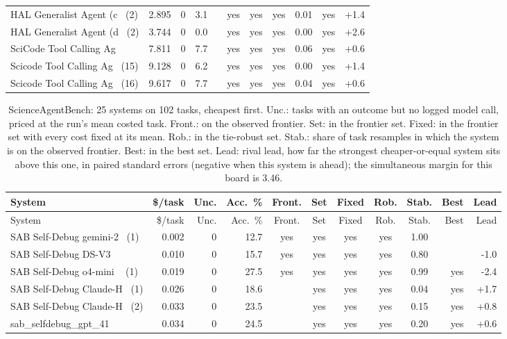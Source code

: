 {\begin{longtable}{lrrrcccccrr}
HAL Generalist Agent (c~ (2) & 2.895 & 0 & 3.1 &  & yes & yes & yes & 0.01 & yes & +1.4 \\
HAL Generalist Agent (d~ (2) & 3.744 & 0 & 0.0 &  & yes & yes & yes & 0.00 & yes & +2.6 \\
SciCode Tool Calling Ag~ & 7.811 & 0 & 7.7 &  & yes & yes & yes & 0.06 & yes & +0.6 \\
Scicode Tool Calling Ag~ (15) & 9.128 & 0 & 6.2 &  & yes & yes & yes & 0.00 & yes & +1.4 \\
Scicode Tool Calling Ag~ (16) & 9.617 & 0 & 7.7 &  & yes & yes & yes & 0.04 & yes & +0.6 \\
\end{longtable}

\begin{longtable}{lrrrcccccrr}
\caption{ScienceAgentBench: 25 systems on 102 tasks, cheapest first. Unc.: tasks with an outcome but no logged model call, priced at the run's mean costed task. Front.: on the observed frontier. Set: in the frontier set. Fixed: in the frontier set with every cost fixed at its mean. Rob.: in the tie-robust set. Stab.: share of task resamples in which the system is on the observed frontier. Best: in the best set. Lead: rival lead, how far the strongest cheaper-or-equal system sits above this one, in paired standard errors (negative when this system is ahead); the simultaneous margin for this board is 3.46.}\label{tab:supp-hal_scienceagentbench}\\
\toprule
System & \$/task & Unc. & Acc.\ \% & Front. & Set & Fixed & Rob. & Stab. & Best & Lead \\
\midrule
\endfirsthead
\toprule
System & \$/task & Unc. & Acc.\ \% & Front. & Set & Fixed & Rob. & Stab. & Best & Lead \\
\midrule
\endhead
\bottomrule
\endfoot
SAB Self-Debug gemini-2~ (1) & 0.002 & 0 & 12.7 & yes & yes & yes & yes & 1.00 &  &  \\
SAB Self-Debug DS-V3 & 0.010 & 0 & 15.7 & yes & yes & yes & yes & 0.80 &  & -1.0 \\
SAB Self-Debug o4-mini ~ (1) & 0.019 & 0 & 27.5 & yes & yes & yes & yes & 0.99 & yes & -2.4 \\
SAB Self-Debug Claude-H~ (1) & 0.026 & 0 & 18.6 &  & yes & yes & yes & 0.04 & yes & +1.7 \\
SAB Self-Debug Claude-H~ (2) & 0.033 & 0 & 23.5 &  & yes & yes & yes & 0.15 & yes & +0.8 \\
sab\_selfdebug\_gpt\_41 & 0.034 & 0 & 24.5 &  & yes & yes & yes & 0.20 & yes & +0.6 \\

\end{longtable}}
